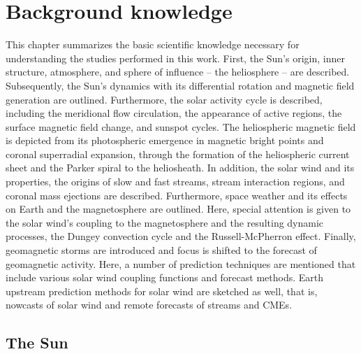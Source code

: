 
\chapter{Background knowledge}
\label{chap:basics}
This chapter summarizes the basic scientific knowledge necessary for understanding the studies performed in this work. First, the Sun's origin, inner structure, atmosphere, and sphere of influence -- the heliosphere -- are described. Subsequently, the Sun's dynamics with its differential rotation and magnetic field generation are outlined. Furthermore, the solar activity cycle is described, including the meridional flow circulation, the appearance of active regions, the surface magnetic field change, and sunspot cycles. The heliospheric magnetic field is depicted from its photospheric emergence in magnetic bright points and coronal superradial expansion, through the formation of the heliospheric current sheet and the Parker spiral to the heliosheath. In addition, the solar wind and its properties, the origins of slow and fast streams, stream interaction regions, and coronal mass ejections are described. Furthermore, space weather and its effects on Earth and the magnetosphere are outlined. Here, special attention is given to the solar wind's coupling to the magnetosphere and the resulting dynamic processes, the Dungey convection cycle and the Russell-McPherron effect. Finally, geomagnetic storms are introduced and focus is shifted to the forecast of geomagnetic activity. Here, a number of prediction techniques are mentioned that include various solar wind coupling functions and \Kp{} forecast methods. Earth upstream prediction methods for solar wind are sketched as well, that is, nowcasts of solar wind and remote forecasts of streams and CMEs.


\section{The Sun}
\label{sec:solar_composition}


